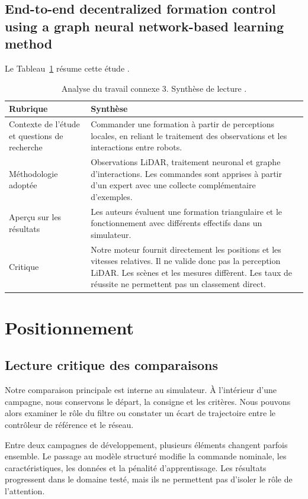 \subsection{End-to-end decentralized formation control using a graph neural network-based learning method}
Le Tableau~\ref{tab:travail-connexe-3} résume cette étude \cite{jiang2023}.
\begin{table}[htbp]
\caption[Analyse du travail connexe 3]{Analyse du travail connexe 3. Synthèse de lecture \cite{jiang2023}.}
\label{tab:travail-connexe-3}
\centering
\begin{tabularx}{\textwidth}{p{3.7cm}X}
\toprule Rubrique & Synthèse\\\midrule
Contexte de l’étude et questions de recherche & Commander une formation à partir de perceptions locales, en reliant le traitement des observations et les interactions entre robots.\\[5pt]
Méthodologie adoptée & Observations LiDAR, traitement neuronal et graphe d’interactions. Les commandes sont apprises à partir d’un expert avec une collecte complémentaire d’exemples.\\[5pt]
Aperçu sur les résultats & Les auteurs évaluent une formation triangulaire et le fonctionnement avec différents effectifs dans un simulateur.\\[5pt]
Critique & Notre moteur fournit directement les positions et les vitesses relatives. Il ne valide donc pas la perception LiDAR. Les scènes et les mesures diffèrent. Les taux de réussite ne permettent pas un classement direct.\\[5pt]
\bottomrule\end{tabularx}
\end{table}

\section{Positionnement}
\subsection{Lecture critique des comparaisons}
Notre comparaison principale est interne au simulateur. À l'intérieur d'une campagne, nous conservons le départ, la consigne et les critères. Nous pouvons alors examiner le rôle du filtre ou constater un écart de trajectoire entre le contrôleur de référence et le réseau.

Entre deux campagnes de développement, plusieurs éléments changent parfois ensemble. Le passage au modèle structuré modifie la commande nominale, les caractéristiques, les données et la pénalité d'apprentissage. Les résultats progressent dans le domaine testé, mais ils ne permettent pas d'isoler le rôle de l'attention.

